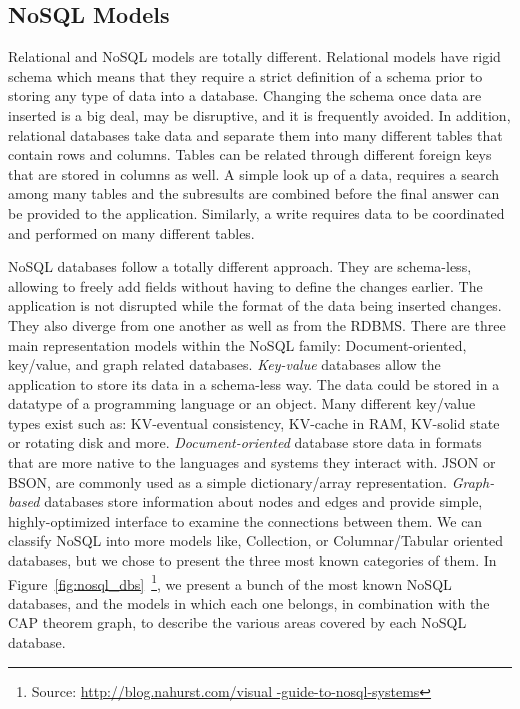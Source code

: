 \subsection{NoSQL Models}

Relational and NoSQL models are totally different. Relational models have rigid
schema which means that they require a strict definition of a schema prior to
storing any type of data into a database. Changing the schema once data are
inserted is a big deal, may be disruptive, and it is frequently avoided. In
addition, relational databases take data and separate them into many different
tables that contain rows and columns. Tables can be related through different
foreign keys that are stored in columns as well. A simple look up of a data,
requires a search among many tables and the subresults are combined before the
final answer can be provided to the application. Similarly, a write requires
data to be coordinated and performed on many different tables.

NoSQL databases follow a totally different approach. They are schema-less,
allowing to freely add fields without having to define the changes earlier.
The application
is not disrupted while the format of the data being inserted changes. They also
diverge from one another as well as from the RDBMS. There are three main
representation models within the NoSQL family:
Document-oriented, key/value, and graph
related databases. \emph{Key-value} databases allow the application to store its
data in a schema-less way. The data could be stored in a datatype of a
programming language or an object. Many different key/value types exist such as:
KV-eventual consistency, KV-cache in RAM, KV-solid state or rotating disk and
more. \emph{Document-oriented} database store data in formats that are more
native to the languages and systems they interact with. JSON or BSON, are
commonly used as a simple dictionary/array representation. \emph{Graph-based}
databases store information about nodes and edges and provide simple,
highly-optimized interface to examine the connections between them. We can
classify
NoSQL into more models like, Collection, or Columnar/Tabular oriented databases,
but we chose to present the three most known categories of them. In
Figure~\ref{fig:nosql_dbs}~\footnote{Source: \url{http://blog.nahurst.com/visual
-guide-to-nosql-systems}}, we present a bunch of the most known NoSQL
databases, and the models in which each one belongs, in combination with the CAP
theorem graph, to describe the various areas covered by each NoSQL database.

